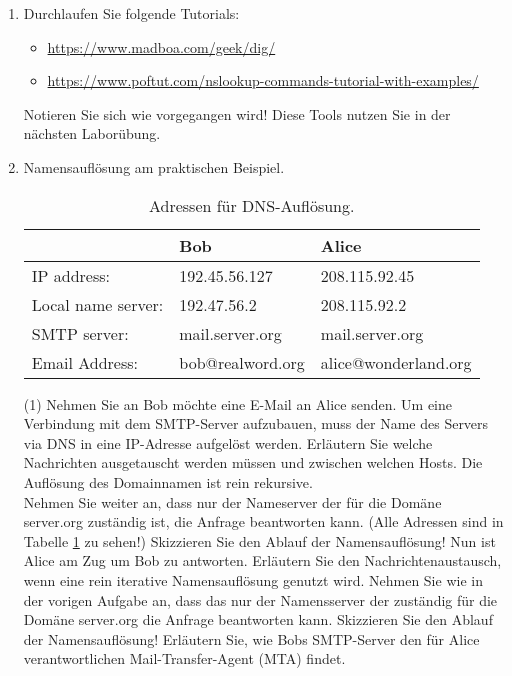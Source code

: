 \documentclass[paper=a4,fontsize=11pt]{scrartcl}%
\numberwithin{equation}{section}
\begin{document}
\begin{enumerate}
\begin{tasks}
	\end{tasks}
	\item Durchlaufen Sie folgende Tutorials:
	\begin{itemize}
	\item \url{https://www.madboa.com/geek/dig/}
	\item \url{https://www.poftut.com/nslookup-commands-tutorial-with-examples/}
	\end{itemize}
	Notieren Sie sich wie vorgegangen wird! Diese Tools nutzen Sie in der nächsten Laborübung.	
\item Namensauflösung am praktischen Beispiel.
\begin{table}[h]
\caption{Adressen für DNS-Auflösung.}
\label{dns_mail}
\centering
\begin{tabular}{lll}
\hline
 & Bob & Alice \\ \hline
 IP address: &  192.45.56.127 & 208.115.92.45\\
 Local name server:& 192.47.56.2 & 208.115.92.2\\
 SMTP server: & mail.server.org & mail.server.org\\
 Email Address: & bob@realword.org & alice@wonderland.org\\ \hline
\end{tabular}
\end{table}
	\begin{tasks}(1)
		\task Nehmen Sie an Bob möchte eine E-Mail an Alice senden. Um eine Verbindung mit dem SMTP-Server aufzubauen, muss der Name des Servers via DNS in eine IP-Adresse aufgelöst werden. Erläutern Sie welche Nachrichten ausgetauscht werden müssen und zwischen welchen Hosts. Die Auflösung des Domainnamen ist rein rekursive.\\
		Nehmen Sie weiter an, dass nur der Nameserver der für die Domäne server.org zuständig ist, die Anfrage beantworten kann. (Alle Adressen sind in Tabelle \ref{dns_mail} zu sehen!) Skizzieren Sie den Ablauf der Namensauflösung!
		\task Nun ist Alice am Zug um Bob zu antworten. Erläutern Sie den Nachrichtenaustausch, wenn eine rein iterative Namensauflösung genutzt wird. Nehmen Sie wie in der vorigen Aufgabe an, dass das nur der Namensserver der zuständig für die Domäne server.org die Anfrage beantworten kann. Skizzieren Sie den Ablauf der Namensauflösung!
		\task Erläutern Sie, wie Bobs SMTP-Server den für Alice verantwortlichen Mail-Transfer-Agent (MTA) findet.
	\end{tasks}	
\end{enumerate}


\end{document}
